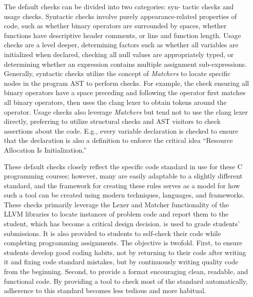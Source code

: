 \documentclass[sigconf]{acmart}
\begin{document}
The default checks can be divided into two categories: syn-
tactic checks and usage checks. Syntactic checks involve purely
appearance-related properties of code, such as whether binary operators are surrounded by spaces, whether functions have descriptive
header comments, or line and function length. Usage checks are a
level deeper, determining factors such as whether all variables are
initialized when declared, checking all null values
are appropriately typed, or determining whether an expression
contains multiple assignment sub-expressions. Generally, syntactic
checks utilize the concept of  \textit{Matchers} to locate specific nodes in the
program AST to perform checks. For example, the check ensuring
all binary operators have a space preceding and following the operator first matches all binary operators, then uses the clang lexer to
obtain tokens around the operator. Usage checks also leverage  \textit{Matchers} but tend not to use the clang lexer directly, preferring to
utilize structural checks and AST visitors to check assertions about
the code. E.g., every variable declaration is checked to ensure that
the declaration is also a definition to enforce the critical idea ``Resource Allocation Is Initialization.''

These default checks closely reflect the specific code standard in use for
these C programming courses; however, many are easily adaptable to a slightly different
standard, and the framework for creating these rules serves as a model for how such a
tool can be created using modern techniques, languages, and frameworks. These checks primarily leverage the Lexer and Matcher functionality of the LLVM libraries
to locate instances of problem code and report them to the student, which has become a
critical design decision. \tool{} is used to grade students' submissions. It is also
provided to students to self-check their code while completing programming
assignments.
The objective is twofold. First, to ensure students develop good coding
habits, not by returning to their code after writing it and fixing code standard
mistakes, but by continuously writing quality code from the beginning. Second, to provide a format encouraging
clean, readable, and functional code. By providing a tool to check most of the standard automatically, adherence to this standard becomes less tedious and more
habitual.



\end{document}
